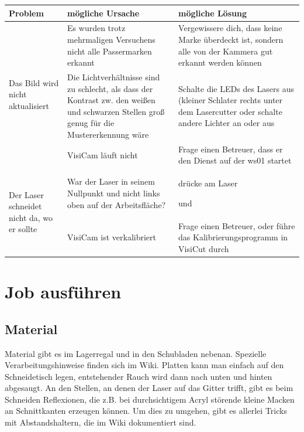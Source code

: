 \documentclass{\basedir/fablab-document}
\newcommand{\knopf}[2]{
    \begin{tikzpicture}[baseline={(box.base)}]
    \node [#1] (box) { 
        \fontsize{9pt}{9pt}\selectfont \textbf{#2}\strut
    };
    \end{tikzpicture}
}
\newcommand{\laserKnopf}[1]{\knopf{laserknopf}{#1}}
\newcommand{\laserXyAus}{\laserKnopf{X/Y aus}}
\newcommand{\laserReset}{\laserKnopf{Reset}}
\begin{document}
\begin{tabularx}{\textwidth}{|X|X|X|}
\hline
Problem		 										& mögliche Ursache															& mögliche Lösung \\ \hline \hline
\multirow{3}{0.333\textwidth}{Das Bild wird nicht aktualisiert}	& Es wurden trotz mehrmaligen Versuchens nicht alle Passermarken erkannt	& Vergewissere dich, dass keine Marke überdeckt ist, sondern alle von der Kammera gut erkannt werden können \\ \cline{2-3}
  													& Die Lichtverhältnisse sind zu schlecht, als dass der Kontrast zw. den weißen und schwarzen Stellen groß genug für die Mustererkennung wäre	& Schalte die LEDs des Lasers aus (kleiner Schlater rechts  unter dem Lasercutter oder schalte andere Lichter an oder aus\\ \cline{2-3}
  													& VisiCam läuft nicht														& Frage einen Betreuer, dass er den Dienst auf der ws01 startet \\ \hline
\multirow{2}{0.333\textwidth}{Der Laser schneidet nicht da, wo er sollte}	& War der Laser in seinem Nullpunkt und nicht links oben auf der Arbeitsfläche?	& drücke am Laser \laserXyAus und \laserReset \\ \cline{2-3}
													& VisiCam ist verkalibriert &	Frage einen Betreuer, oder führe das Kalibrierungsprogramm in VisiCut durch \\ \hline

\end{tabularx}

\section{Job ausführen}

\subsection{Material}
Material gibt es im Lagerregal und in den Schubladen nebenan. Spezielle Verarbeitungshinweise finden sich im Wiki. Platten kann man einfach auf den Schneidetisch legen, entstehender Rauch wird dann nach unten und hinten abgesaugt. An den Stellen, an denen der Laser auf das Gitter trifft, gibt es beim Schneiden Reflexionen, die z.B. bei durchsichtigem Acryl störende kleine Macken an Schnittkanten erzeugen können. Um dies zu umgehen, gibt es allerlei Tricks mit Abstandshaltern, die im Wiki dokumentiert sind.

\end{document}
